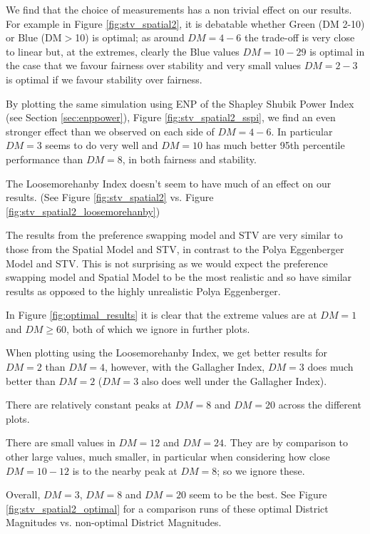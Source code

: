 \documentclass{article}
\begin{document}
We find that the choice of measurements has a non trivial effect on our results. For example in Figure \ref{fig:stv_spatial2}, it is debatable whether Green (DM 2-10) or Blue (DM$>$10) is optimal; as around $DM=4-6$ the trade-off is very close to linear but, at the extremes, clearly the Blue values $DM=10-29$ is optimal in the case that we favour fairness over stability and very small values $DM=2-3$ is optimal if we favour stability over fairness.

By plotting the same simulation using ENP of the Shapley Shubik Power Index (see Section \ref{sec:enppower}), Figure \ref{fig:stv_spatial2_sspi}, we find an even stronger effect than we observed on each side of $DM=4-6$. In particular $DM=3$ seems to do very well and $DM=10$ has much better 95th percentile performance than $DM=8$, in both fairness and stability.

The Loosemorehanby Index doesn't seem to have much of an effect on our results. (See Figure \ref{fig:stv_spatial2} vs. Figure \ref{fig:stv_spatial2_loosemorehanby})

The results from the preference swapping model and STV are very similar to those from the Spatial Model and STV, in contrast to the Polya Eggenberger Model and STV. This is not surprising as we would expect the preference swapping model and Spatial Model to be the most realistic and so have similar results as opposed to the highly unrealistic Polya Eggenberger.


In Figure \ref{fig:optimal_results} it is clear that the extreme values are at $DM = 1$ and $DM \geq 60$, both of which we ignore in further plots.

When plotting using the Loosemorehanby Index, we get better results for $DM=2$ than $DM=4$, however, with the Gallagher Index, $DM=3$ does much better than $DM=2$ ($DM=3$ also does well under the Gallagher Index).

There are relatively constant peaks at $DM=8$ and $DM=20$ across the different plots.

There are small values in $DM=12$ and $DM=24$. They are by comparison to other large values, much smaller, in particular when considering how close $DM=10-12$ is to the nearby peak at $DM=8$; so we ignore these.

Overall, $DM=3$, $DM=8$ and $DM=20$ seem to be the best. See Figure \ref{fig:stv_spatial2_optimal} for a comparison runs of these optimal District Magnitudes vs. non-optimal District Magnitudes.
\end{document}
